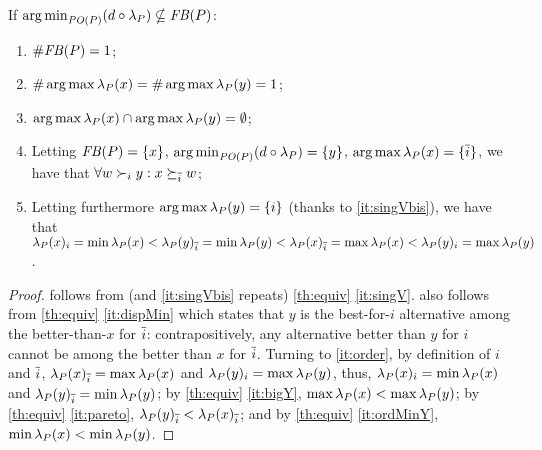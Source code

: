 \documentclass[pagesize, twoside=off, bibliography=totoc, DIV=calc, fontsize=12pt, a4paper]{scrartcl}
\begin{document}
\begin{corollary}
	\label{th:rhoMin}
	If $\operatorname*{arg\,min}_{\mathit{PO}(P)} (d \circ \lambda_P) \nsubseteq \mathit{FB}(P)$:
	\begin{enumerate}
		\item $\# \mathit{FB}(P) = 1$;
		\item \label{it:singVC} $\# \operatorname*{arg\,max} \lambda_P(x) = \# \operatorname*{arg\,max} \lambda_P(y) = 1$;
		\item \label{it:singVbis} $\operatorname*{arg\,max} \lambda_P(x) \cap \operatorname*{arg\,max} \lambda_P(y) = \emptyset$;
		\item \label{it:rhoMin} Letting $\mathit{FB}(P) = \{x\}$, $\operatorname*{arg\,min}_{\mathit{PO}(P)} (d \circ \lambda_P) = \{y\}$, $\operatorname*{arg\,max} \lambda_P(x) = \{\overline{i}\}$, we have that $\forall w \succ_i y: x \succeq_{\overline{i}} w$;
		\item \label{it:order} Letting furthermore $\operatorname*{arg\,max} \lambda_P(y) = \{i\}$ (thanks to \cref{it:singVbis}), we have that $\lambda_P(x)_i = \min \lambda_P(x) < \lambda_P(y)_{\overline{i}} = \min \lambda_P(y) < \lambda_P(x)_{\overline{i}} = \max \lambda_P(x) < \lambda_P(y)_i = \max \lambda_P(y)$.
	\end{enumerate}
\end{corollary}
\begin{proof}
	 follows from (and \cref{it:singVbis} repeats) \cref{th:equiv} \cref{it:singV}.
	 also follows from \cref{th:equiv} \cref{it:dispMin} which states that $y$ is the best-for-$i$ alternative among the better-than-$x$ for $\overline{i}$: contrapositively, any alternative better than $y$ for $i$ cannot be among the better than $x$ for $\overline{i}$.
	Turning to \cref{it:order}, by definition of $i$ and $\overline{i}$, $\lambda_P(x)_{\overline{i}} = \max \lambda_P(x)$ and $\lambda_P(y)_i = \max \lambda_P(y)$, thus, $\lambda_P(x)_i = \min \lambda_P(x)$ and $\lambda_P(y)_{\overline{i}} = \min \lambda_P(y)$; by \cref{th:equiv} \cref{it:bigY}, $\max \lambda_P(x) < \max \lambda_P(y)$; by \cref{th:equiv} \cref{it:pareto}, $\lambda_P(y)_{\overline{i}} < \lambda_P(x)_{\overline{i}}$; and by \cref{th:equiv} \cref{it:ordMinY}, $\min \lambda_P(x) < \min \lambda_P(y)$.
\end{proof}
\end{document}

